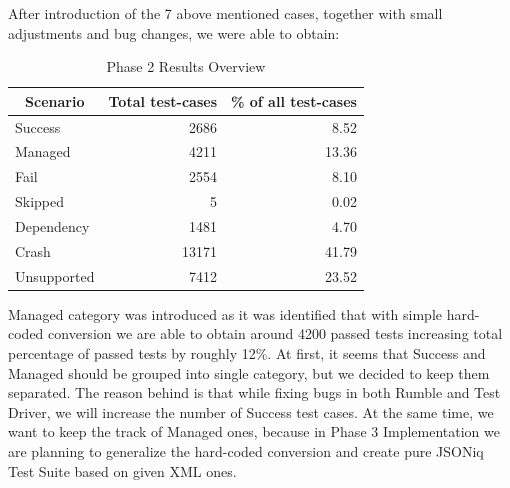 After introduction of the 7 above mentioned cases, together with small adjustments and bug changes, we were able to obtain:
\begin{table}[h!]
	\centering
	\begin{tabular}{|l|r|r|}
		\hline
		\multicolumn{1}{|c|}{Scenario} & \multicolumn{1}{c|}{Total test-cases} & \multicolumn{1}{c|}{\% of all test-cases} \\ \hline
		Success                        & 2686                                  & 8.52                                      \\ \hline
		Managed                        & 4211                                  & 13.36                                     \\ \hline
		Fail                           & 2554                                  & 8.10                                      \\ \hline
		Skipped                        & 5                                     & 0.02                                      \\ \hline
		Dependency                     & 1481                                  & 4.70                                      \\ \hline
		Crash                          & 13171                                 & 41.79                                     \\ \hline
		Unsupported                    & 7412                                  & 23.52                                     \\ \hline
	\end{tabular}
	\caption{Phase 2 Results Overview}
	\label{tab:Phase2_ResultTable}
\end{table}

Managed category was introduced as it was identified that with simple hard-coded conversion we are able to obtain around 4200 passed tests increasing total percentage of passed tests by roughly 12\%. At first, it seems that Success and Managed should be grouped into single category, but we decided to keep them separated. The reason behind is that while fixing bugs in both Rumble and Test Driver, we will increase the number of Success test cases. At the same time, we want to keep the track of Managed ones, because in Phase 3 Implementation we are planning to generalize the hard-coded conversion and create pure JSONiq Test Suite based on given XML ones.


